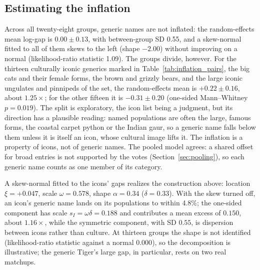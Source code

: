\documentclass[11pt]{article}
\begin{document}
\subsection{Estimating the inflation}
Across all twenty-eight groups, generic names are not inflated: the random-effects mean log-gap is $0.00\pm0.13$, with between-group SD 0.55, and a skew-normal fitted to all of them skews to the left (shape $-2.00$) without improving on a normal (likelihood-ratio statistic 1.09). The groups divide, however. For the thirteen culturally iconic generics marked in Table~\ref{tab:inflation_pairs}, the big cats and their female forms, the brown and grizzly bears, and the large iconic ungulates and pinnipeds of the set, the random-effects mean is $+0.22\pm0.16$, about $1.25\times$; for the other fifteen it is $-0.31\pm0.20$ (one-sided Mann--Whitney $p=0.019$). The split is exploratory, the icon list being a judgment, but its direction has a plausible reading: named populations are often the large, famous forms, the coastal carpet python or the Indian gaur, so a generic name falls below them unless it is itself an icon, whose cultural image lifts it. The inflation is a property of icons, not of generic names. The pooled model agrees: a shared offset for broad entries is not supported by the votes (Section~\ref{sec:pooling}), so each generic name counts as one member of its category.

A skew-normal fitted to the icons' gaps realizes the construction above: location $\xi=+0.047$, scale $\omega=0.578$, shape $\alpha=0.34$ ($\delta=0.33$). With the skew turned off, an icon's generic name lands on its populations to within 4.8\%; the one-sided component has scale $s_I=\omega\delta=0.188$ and contributes a mean excess of $0.150$, about $1.16\times$, while the symmetric component, with SD $0.55$, is dispersion between icons rather than culture. At thirteen groups the shape is not identified (likelihood-ratio statistic against a normal $0.000$), so the decomposition is illustrative; the generic Tiger's large gap, in particular, rests on two real matchups.
\end{document}
